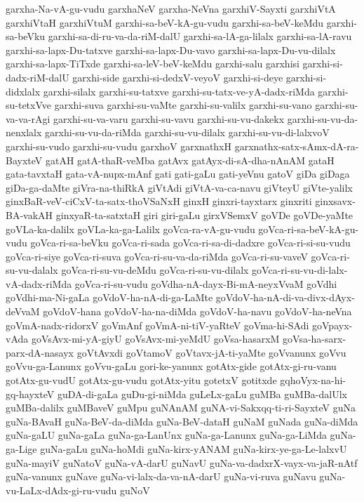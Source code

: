 {garxha-Na-vA-gu-vudu
garxhaNeV
garxha-NeVna
garxhiV-Sayxti
garxhiVtA
garxhiVtaH
garxhiVtuM
garxhi-sa-beV-kA-gu-vudu
garxhi-sa-beV-keMdu
garxhi-sa-beVku
garxhi-sa-di-ru-va-da-riM-dalU
garxhi-sa-lA-ga-lilalx
garxhi-sa-lA-ravu
garxhi-sa-lapx-Du-tatxve
garxhi-sa-lapx-Du-vavo
garxhi-sa-lapx-Du-vu-dilalx
garxhi-sa-lapx-TiTxde
garxhi-sa-leV-beV-keMdu
garxhi-salu
garxhisi
garxhi-si-dadx-riM-dalU
garxhi-side
garxhi-si-dedxV-veyoV
garxhi-si-deye
garxhi-si-didxlalx
garxhi-silalx
garxhi-su-tatxve
garxhi-su-tatx-ve-yA-dadx-riMda
garxhi-su-tetxVve
garxhi-suva
garxhi-su-vaMte
garxhi-su-valilx
garxhi-su-vano
garxhi-su-va-va-rAgi
garxhi-su-va-varu
garxhi-su-vavu
garxhi-su-vu-dakekx
garxhi-su-vu-da-nenxlalx
garxhi-su-vu-da-riMda
garxhi-su-vu-dilalx
garxhi-su-vu-di-lalxvoV
garxhi-su-vudo
garxhi-su-vudu
garxhoV
garxnathxH
garxnathx-satx-sAmx-dA-ra-BayxteV
gatAH
gatA-thaR-veMba
gatAvx
gatAyx-di-sA-dha-nAnAM
gataH
gata-tavxtaH
gata-vA-nupx-mAnf
gati
gati-gaLu
gati-yeVnu
gatoV
giDa
giDaga
giDa-ga-daMte
giVra-na-thiRkA
giVtAdi
giVtA-va-ca-navu
giVteyU
giVte-yalilx
ginxBaR-veV-ciCxV-ta-satx-thoVSaNxH
ginxH
ginxri-tayxtarx
ginxriti
ginxsavx-BA-vakAH
ginxyaR-ta-satxtaH
giri
giri-gaLu
girxVSemxV
goVDe
goVDe-yaMte
goVLa-ka-dalilx
goVLa-ka-ga-Lalilx
goVca-ra-vA-gu-vudu
goVca-ri-sa-beV-kA-gu-vudu
goVca-ri-sa-beVku
goVca-ri-sada
goVca-ri-sa-di-dadxre
goVca-ri-si-su-vudu
goVca-ri-siye
goVca-ri-suva
goVca-ri-su-va-da-riMda
goVca-ri-su-vaveV
goVca-ri-su-vu-dalalx
goVca-ri-su-vu-deMdu
goVca-ri-su-vu-dilalx
goVca-ri-su-vu-di-lalx-vA-dadx-riMda
goVca-ri-su-vudu
goVdha-nA-dayx-Bi-mA-neyxVvaM
goVdhi
goVdhi-ma-Ni-gaLa
goVdoV-ha-nA-di-ga-LaMte
goVdoV-ha-nA-di-va-divx-dAyx-deVvaM
goVdoV-hana
goVdoV-ha-na-diMda
goVdoV-ha-navu
goVdoV-ha-neVna
goVmA-nadx-ridorxV
goVmAnf
goVmA-ni-tiV-yaRteV
goVma-hi-SAdi
goVpayx-vAda
goVsAvx-mi-yA-giyU
goVsAvx-mi-yeMdU
goVsa-hasarxM
goVsa-ha-sarx-parx-dA-nasayx
goVtAvxdi
goVtamoV
goVtavx-jA-ti-yaMte
goVvanunx
goVvu
goVvu-ga-Lanunx
goVvu-gaLu
gori-ke-yanunx
gotAtx-gide
gotAtx-gi-ru-vanu
gotAtx-gu-vudU
gotAtx-gu-vudu
gotAtx-yitu
gotetxV
gotitxde
gqhoVyx-na-hi-gq-hayxteV
guDA-di-gaLa
guDu-gi-niMda
guLeLx-gaLu
guMBa
guMBa-dalUlx
guMBa-dalilx
guMBaveV
guMpu
guNAnAM
guNA-vi-Sakxqq-ti-ri-SayxteV
guNa
guNa-BAvaH
guNa-BeV-da-diMda
guNa-BeV-dataH
guNaM
guNada
guNa-diMda
guNa-gaLU
guNa-gaLa
guNa-ga-LanUnx
guNa-ga-Lanunx
guNa-ga-LiMda
guNa-ga-Lige
guNa-gaLu
guNa-hoMdi
guNa-kirx-yANAM
guNa-kirx-ye-ga-Le-lalxvU
guNa-mayiV
guNatoV
guNa-vA-darU
guNavU
guNa-va-dadxrX-vayx-va-jaR-nAtf
guNa-vanunx
guNave
guNa-vi-lalx-da-va-nA-darU
guNa-vi-ruva
guNavu
guNa-vu-LaLx-dAdx-gi-ru-vudu
guNoV
}
